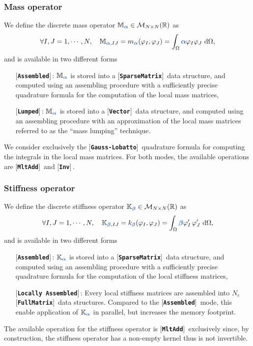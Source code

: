 \documentclass[11pt,a4paper]{article}
\newcommand{\param}[1]{\bm{{\color{myhyperblue}{#1}}}}
\newcommand{\keyword}[1]{[\texttt{\textbf{#1}}]\!\,}
\begin{document}
\subsubsection{Mass operator}
We define the discrete mass operator $\mathbb{M}_{\param{\alpha}} \in \mathcal{M}_{N\times N}(\mathbb{R})$ as
\begin{equation*}
\forall I,J = 1,\cdots, N,\quad \mathbb{M}_{\param{\alpha}, IJ} = m_{\param{\alpha}}(\varphi_I, \varphi_J) = \int_\Omega \param{\alpha} \varphi_I\varphi_J~\mathrm{d}\Omega,
\end{equation*}
and is available in two different forms
\begin{itemize}
\item[] \keyword{Assembled}: $\mathbb{M}_{\param{\alpha}}$ is stored into a \keyword{SparseMatrix} data structure, and computed using an assembling procedure with a sufficiently precise quadrature formula for the computation of the local mass matrices,
\item[] \keyword{Lumped}:  $\mathbb{M}_{\param{\alpha}}$ is stored into a \keyword{Vector} data structure, and computed using an assembling procedure with an approximation of the local mass matrices referred to as the ``mass lumping'' technique.
\end{itemize}
We consider exclusively the \keyword{Gauss-Lobatto} quadrature formula for computing the integrals in the local mass matrices. For both modes, the available operations are \keyword{MltAdd} and \keyword{Inv}.

\subsubsection{Stiffness operator}
We define the discrete stiffness operator $\mathbb{K}_{\param{\beta}} \in \mathcal{M}_{N\times N}(\mathbb{R})$ as
\begin{equation*}
\forall I,J = 1,\cdots, N,\quad \mathbb{K}_{\param{\beta}, IJ} = k_{\param{\beta}}(\varphi_I, \varphi_J) = \int_\Omega \param{\beta}\varphi_I^\prime\,\varphi_J^\prime~\mathrm{d}\Omega,
\end{equation*}
and is available in two different forms
\begin{itemize}
\item[] \keyword{Assembled}: $\mathbb{K}_{\param{\alpha}}$ is stored into a \keyword{SparseMatrix} data structure, and computed using an assembling procedure with a sufficiently precise quadrature formula for the computation of the local stiffness matrices,
\item[] \keyword{Locally Assembled}: Every local stiffness matrices are assembled into $N_e$ \keyword{FullMatrix} data structures. Compared to  the \keyword{Assembled} mode, this enable application of $\mathbb{K}_{\param{\alpha}}$ in parallel, but increases the memory footprint.
\end{itemize}
The available operation for the stiffness operator is \keyword{MltAdd} exclusively since, by construction, the stiffness operator has a non-empty kernel thus is not invertible.
\end{document}
